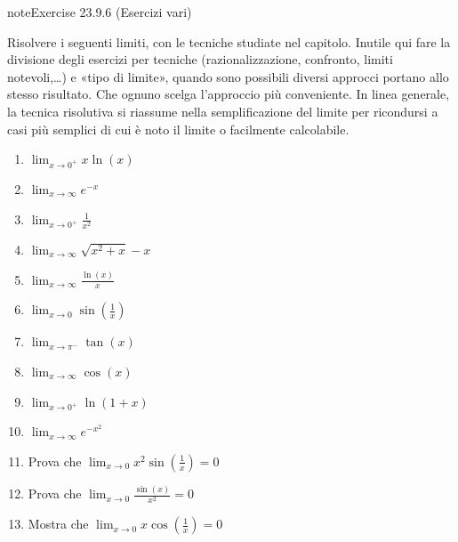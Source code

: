 \documentclass[letterpaper,10pt,italian]{jupyterBook}
\begin{document}
\begin{sphinxadmonition}{note}{Exercise 23.9.6 (Esercizi vari)}



\sphinxAtStartPar
Risolvere i seguenti limiti, con le tecniche studiate nel capitolo. Inutile qui fare la divisione degli esercizi per tecniche (razionalizzazione, confronto, limiti notevoli,…) e «tipo di limite», quando sono possibili diversi approcci portano allo stesso risultato. Che ognuno scelga l’approccio più conveniente. In linea generale, la tecnica risolutiva si riassume nella semplificazione del limite per ricondursi a casi più semplici di cui è noto il limite o facilmente calcolabile.
\begin{enumerate}
%
\item {} 
\sphinxAtStartPar
\(\lim_{x \to 0^+} x \ln(x)\)

\item {} 
\sphinxAtStartPar
\(\lim_{x \to \infty} e^{-x}\)

\item {} 
\sphinxAtStartPar
\(\lim_{x \to 0^+} \frac{1}{x^2}\)

\item {} 
\sphinxAtStartPar
\(\lim_{x \to \infty} \sqrt{x^2 + x} - x\)

\item {} 
\sphinxAtStartPar
\(\lim_{x \to \infty} \frac{\ln(x)}{x}\)

\item {} 
\sphinxAtStartPar
\(\lim_{x \to 0} \sin\left(\frac{1}{x}\right)\)

\item {} 
\sphinxAtStartPar
\(\lim_{x \to \pi^-} \tan(x)\)

\item {} 
\sphinxAtStartPar
\(\lim_{x \to \infty} \cos(x)\)

\item {} 
\sphinxAtStartPar
\(\lim_{x \to 0^+} \ln(1 + x)\)

\item {} 
\sphinxAtStartPar
\(\lim_{x \to \infty} e^{-x^2}\)

\item {} 
\sphinxAtStartPar
Prova che \(\lim_{x \to 0} x^2 \sin\left(\frac{1}{x}\right) = 0\)

\item {} 
\sphinxAtStartPar
Prova che \(\lim_{x \to 0} \frac{\sin(x)}{x^2} = 0\)

\item {} 
\sphinxAtStartPar
Mostra che \(\lim_{x \to 0} x \cos\left(\frac{1}{x}\right) = 0\)


\end{enumerate}
\end{sphinxadmonition}
\end{document}
